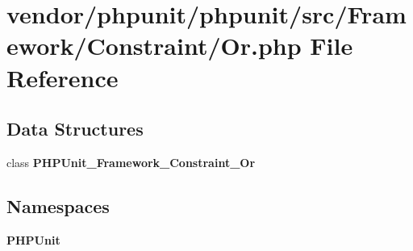 \section{vendor/phpunit/phpunit/src/\+Framework/\+Constraint/\+Or.php File Reference}
\label{_or_8php}
\subsection*{Data Structures}
\begin{DoxyCompactItemize}
\item 
class {\bf P\+H\+P\+Unit\+\_\+\+Framework\+\_\+\+Constraint\+\_\+\+Or}
\end{DoxyCompactItemize}
\subsection*{Namespaces}
\begin{DoxyCompactItemize}
\item 
 {\bf P\+H\+P\+Unit}
\end{DoxyCompactItemize}
